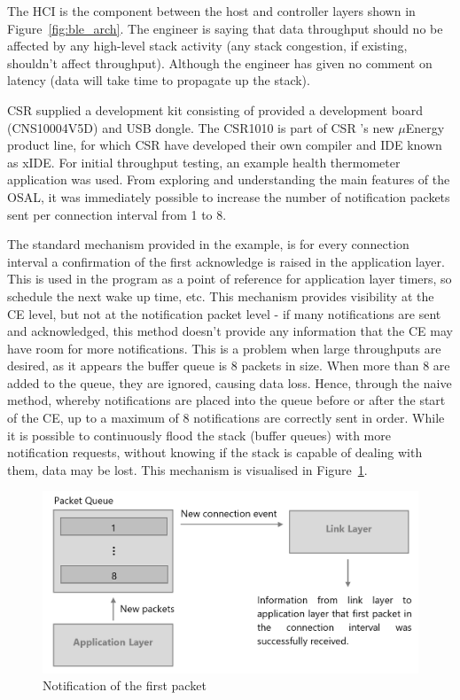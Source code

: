 \documentclass[]{article}
\begin{document}
The \ac{HCI} is the component between the host and controller layers shown in Figure~\ref{fig:ble_arch}. The engineer is saying that data throughput should no be affected by any high-level stack activity (any stack congestion, if existing, shouldn't affect throughput). Although the engineer has given no comment on latency (data will take time to propagate up the stack).

 \ac{CSR} supplied a development kit consisting of  provided a development board (CNS10004V5D) and \ac{USB} dongle. The CSR1010 is part of \ac{CSR} 's new $\mu$Energy product line, for which \ac{CSR} have developed their own compiler and \ac{IDE} known as xIDE. For initial throughput testing, an example health thermometer application was used. From exploring and understanding the main features of the \ac{OSAL}, it was immediately possible to increase the number of notification packets sent per connection interval from 1 to 8. 

The standard mechanism provided in the example, is for every connection interval a confirmation of the first acknowledge is raised in the application layer. This is used in the program as a point of reference for application layer timers, so schedule the next wake up time, etc.  This mechanism provides visibility at the \ac{CE} level, but not at the notification packet level - if many notifications are sent and acknowledged, this method doesn't provide any information that the \ac{CE} may have room for more notifications. This is a problem when large throughputs are desired, as it appears the buffer queue is 8 packets in size. When more than 8 are added to the queue, they are ignored, causing data loss. Hence, through the naive method, whereby notifications are placed into the queue before or after the start of the \ac{CE}, up to a maximum of 8 notifications are correctly sent in order. While it is possible to continuously flood the stack (buffer queues) with more notification requests, without knowing if the stack is capable of dealing with them, data may be lost. This mechanism is visualised in Figure~\ref{fig:nols}. 

\begin{figure}[H]
	\begin{center}
		\includegraphics[width = \textwidth]{nols}
	\end{center}
	\caption{Notification of the first packet}
	\label{fig:nols}
\end{figure}
\end{document}
